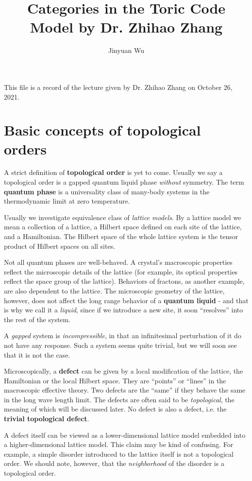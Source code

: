\documentclass[hyperref, a4paper]{article}
\title{Categories in the Toric Code Model by Dr. Zhihao Zhang}
\author{Jinyuan Wu}
\newcommand*{\concept}[1]{{\textbf{#1}}}
\begin{document}
\maketitle

This file is a record of the lecture given by Dr. Zhihao Zhang on October 26, 2021.

\section{Basic concepts of topological orders}

A strict definition of \concept{topological order} is yet to come. Usually we say a topological order is a gapped quantum liquid phase \emph{without} symmetry.
The term \concept{quantum phase} is a universality class of many-body systems in the thermodynamic limit at zero temperature.

Usually we investigate equivalence class of \emph{lattice models}. By a lattice model we mean a collection of a lattice, a Hilbert space defined on each site of the lattice, and a Hamiltonian.
The Hilbert space of the whole lattice system is the tensor product of Hilbert spaces on all sites.

Not all quantum phases are well-behaved. A crystal's macroscopic properties reflect the microscopic details of the lattice (for example, its optical properties reflect the space group of the lattice).
Behaviors of fractons, as another example, are also dependent to the lattice.
The microscopic geometry of the lattice, however, does not affect the long range behavior of a \concept{quantum liquid} - and that is why we call it a \emph{liquid}, since if we introduce a new site, it soon ``resolves'' into the rest of the system.

A \emph{gapped} system is \emph{incompressible}, in that an infinitesimal perturbation of it do not have any response.
Such a system seems quite trivial, but we will soon see that it is not the case.

Microscopically, a \concept{defect} can be given by a local modification of the lattice, the Hamiltonian or the local Hilbert space. 
They are ``points'' or ``lines'' in the macroscopic effective theory.
Two defects are the ``same'' if they behave the same in the long wave length limit.
The defects are often said to be \emph{topological}, the meaning of which will be discussed later.
No defect is also a defect, i.e. the \concept{trivial topological defect}.

A defect itself can be viewed as a lower-dimensional lattice model embedded into a higher-dimensional lattice model. 
This claim may be kind of confusing. For example, a simple disorder introduced to the lattice itself is not a topological order.
We should note, however, that the \emph{neighborhood} of the disorder is a topological order.
\end{document}
